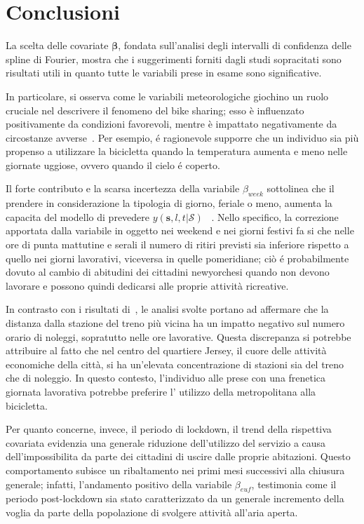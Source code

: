 \section{Conclusioni}
La scelta delle covariate $\boldsymbol{\beta}$, fondata sull'analisi degli intervalli di confidenza delle spline di Fourier, mostra che i suggerimenti forniti dagli studi sopracitati sono risultati utili in quanto tutte le variabili prese in esame sono significative. \par In particolare, si osserva come le variabili meteorologiche giochino un ruolo cruciale nel descrivere il fenomeno del bike sharing; esso è influenzato positivamente da condizioni favorevoli, mentre è impattato negativamente da circostanze avverse~\citep{paper_bike_sharing_e_meteo}. Per esempio, é ragionevole supporre che un individuo sia più propenso a utilizzare la bicicletta quando la temperatura aumenta e meno nelle giornate uggiose, ovvero quando il cielo é coperto.
\par Il forte contributo e la scarsa incertezza della variabile $\beta_{week}$ sottolinea che il prendere in considerazione la tipologia di giorno, feriale o meno, aumenta la capacita del modello di prevedere $y(\mathbf{s}, l, t| \mathcal{S})$ ~\citep{paper_bike_sharing_Otto}. Nello specifico, la correzione apportata dalla variabile in oggetto nei weekend e nei giorni festivi fa si che nelle ore di punta mattutine e serali il numero di ritiri previsti sia inferiore rispetto a quello nei giorni lavorativi, viceversa in quelle pomeridiane; ciò é probabilmente dovuto al cambio di abitudini dei cittadini newyorchesi quando non devono lavorare e possono quindi dedicarsi alle proprie attività ricreative.
\par In contrasto con i risultati di~\cite{paper_bike_sharing_e_meteo}, le analisi svolte portano ad affermare che la distanza dalla stazione del treno più vicina ha un impatto negativo sul numero orario di noleggi, sopratutto nelle ore lavorative. Questa discrepanza si potrebbe attribuire al fatto che nel centro del quartiere Jersey, il cuore delle attività economiche della città, si ha un'elevata concentrazione di stazioni sia del treno che di noleggio. In questo contesto, l'individuo alle prese con una frenetica giornata lavorativa potrebbe preferire l' utilizzo della metropolitana alla bicicletta.
\par Per quanto concerne, invece, il periodo di lockdown, il trend della rispettiva covariata evidenzia una generale riduzione dell'utilizzo del servizio a causa dell'impossibilita da parte dei cittadini di uscire dalle proprie abitazioni. Questo comportamento subisce un ribaltamento nei primi mesi successivi alla chiusura generale; infatti, l'andamento positivo della variabile $\beta_{euf}$, testimonia come il periodo post-lockdown sia stato caratterizzato da un generale incremento della voglia da parte della popolazione di svolgere attività all'aria aperta.
